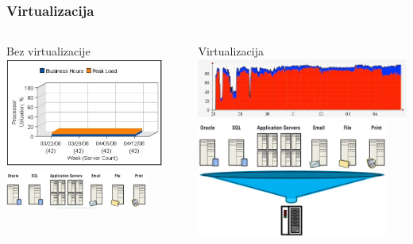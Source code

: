 \documentclass[t]{beamer}
\begin{document}
\begin{frame}
	\frametitle{Virtualizacija}
	\begin{columns}[T]
		\begin{column}{0.5\textwidth}
			\centering
			Bez virtualizacije\\
			\vspace{1em}
			\includegraphics[width=0.9\textwidth]{no_virt_chart.jpg}
			\vspace{1em}
			\includegraphics[width=0.8\textwidth]{no_virt_apps.jpg}
		\end{column}
		\begin{column}{0.5\textwidth}
			\centering
			Virtualizacija\\
			\vspace{2em}
			\includegraphics[width=\textwidth]{virt_chart.jpg}
			\vspace{1em}
			\includegraphics[width=0.9\textwidth]{virt_apps.jpg}
		\end{column}
	\end{columns}
\end{frame}
\end{document}
